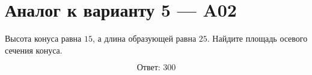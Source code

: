 \documentclass[12pt,a4paper]{article}
\begin{document}
\section*{Аналог к варианту 5 — A02}

Высота конуса равна \(15\), а длина образующей равна \(25\). Найдите площадь осевого сечения конуса.

\begin{center}
\end{center}

\[
\boxed{\text{Ответ: }300}
\]
\end{document}
